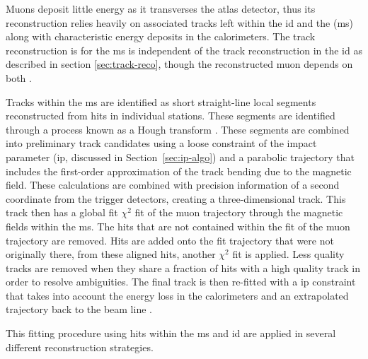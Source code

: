 Muons deposit little energy as it transverses the \gls{atlas} detector, thus its reconstruction relies heavily on associated tracks left within the \gls{id} and the (\gls{ms}) 
along with characteristic energy deposits in the calorimeters. The track reconstruction is for the \gls{ms} is independent of the track reconstruction in the \gls{id} as described 
in section \ref{sec:track-reco}, though the reconstructed muon depends on both \cite{muon-reco}.
\par  
Tracks within the \gls{ms} are identified as short straight-line local segments reconstructed from hits in individual stations. These segments are identified through a process 
known as a Hough transform \cite{Hough}. These segments are combined into preliminary track candidates using a loose constraint of the impact parameter (\gls{ip}, discussed in Section~\ref{sec:ip-algo}) and a parabolic trajectory that includes the first-order approximation of the track bending due to the magnetic field. These calculations are combined with precision 
information of a second coordinate from the trigger detectors, creating a three-dimensional track. This track then has a global fit $\chi^{\textrm{2}}$ fit of the muon trajectory
through the magnetic fields within the \gls{ms}. The hits that are not contained within the fit of the muon trajectory are removed. Hits are added onto the fit trajectory that 
were not originally there, from these aligned hits, another $\chi^{\textrm{2}}$ fit is applied. Less quality tracks are removed when they share a fraction of hits with a high 
quality track in order to resolve ambiguities. The final track is then re-fitted with a \gls{ip} constraint that takes into account the energy loss in the calorimeters and 
an extrapolated trajectory back to the beam line \cite{muon-reco}. 
\par
This fitting procedure using hits within the \gls{ms} and \gls{id} are applied in several different reconstruction strategies.

